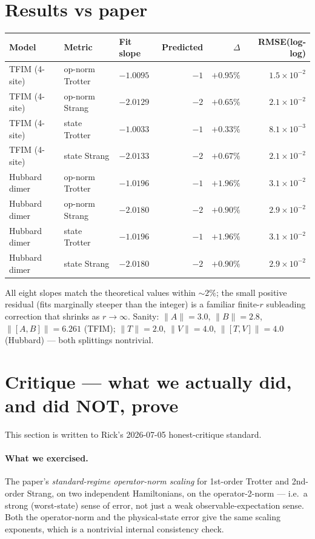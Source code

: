 \documentclass[11pt]{article}
\begin{document}
\section{Results vs paper}
\begin{center}
\begin{tabular}{lllrrr}
\toprule
Model & Metric & Fit slope & Predicted & $\Delta$ & RMSE(log-log) \\
\midrule
TFIM (4-site) & op-norm Trotter & $-1.0095$ & $-1$ & $+0.95\%$ & $1.5\times10^{-2}$ \\
TFIM (4-site) & op-norm Strang  & $-2.0129$ & $-2$ & $+0.65\%$ & $2.1\times10^{-2}$ \\
TFIM (4-site) & state Trotter   & $-1.0033$ & $-1$ & $+0.33\%$ & $8.1\times10^{-3}$ \\
TFIM (4-site) & state Strang    & $-2.0133$ & $-2$ & $+0.67\%$ & $2.1\times10^{-2}$ \\
Hubbard dimer & op-norm Trotter & $-1.0196$ & $-1$ & $+1.96\%$ & $3.1\times10^{-2}$ \\
Hubbard dimer & op-norm Strang  & $-2.0180$ & $-2$ & $+0.90\%$ & $2.9\times10^{-2}$ \\
Hubbard dimer & state Trotter   & $-1.0196$ & $-1$ & $+1.96\%$ & $3.1\times10^{-2}$ \\
Hubbard dimer & state Strang    & $-2.0180$ & $-2$ & $+0.90\%$ & $2.9\times10^{-2}$ \\
\bottomrule
\end{tabular}
\end{center}
All eight slopes match the theoretical values within $\sim 2\%$; the small positive
residual (fits marginally steeper than the integer) is a familiar finite-$r$ subleading
correction that shrinks as $r \to \infty$. Sanity: $\|A\|=3.0$, $\|B\|=2.8$,
$\|[A,B]\|=6.261$ (TFIM); $\|T\|=2.0$, $\|V\|=4.0$, $\|[T,V]\|=4.0$ (Hubbard) --- both
splittings nontrivial.

\section{Critique --- what we actually did, and did NOT, prove}
This section is written to Rick's 2026-07-05 honest-critique standard.

\paragraph{What we exercised.}
The paper's \emph{standard-regime operator-norm scaling} for 1st-order Trotter and
2nd-order Strang, on two independent Hamiltonians, on the operator-2-norm --- i.e.\ a
strong (worst-state) sense of error, not just a weak observable-expectation sense.
Both the operator-norm and the physical-state error give the same scaling exponents,
which is a nontrivial internal consistency check.
\end{document}
